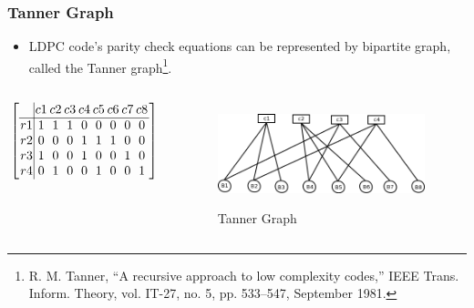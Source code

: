 \documentclass[xcolor=dvipsname]
{beamer}
\begin{document}
\begin{frame}[t]
	\frametitle{ Tanner Graph}
	\begin{itemize}
	\item LDPC code's parity check equations can be represented by bipartite graph, called the Tanner graph\footnote{R. M. Tanner, “A recursive approach to low complexity codes,” IEEE
Trans. Inform. Theory, vol. IT-27, no. 5, pp. 533–547, September 1981.}.
	\end{itemize}

	\begin{columns}[totalwidth=\textwidth]
		\begin{column}{0.5\textwidth}
		\centering
\[
\begingroup %
\setlength\arraycolsep{1pt}
\left[ \begin{array} {c|cccccccc} 
  &    c1 &   c2 &   c3 &  c4  &  c5  &  c6  &  c7  &  c8 \\ \hline
r1 &    1  &   1  &   1  &   0  &   0  &   0  &   0  &   0 \\
r2 &    0  &   0  &   0  &   1  &   1  &   1  &   0  &   0 \\ 
r3 &    1  &   0  &   0  &   1  &   0  &   0  &   1  &   0 \\
r4 &    0  &   1  &   0  &   0  &   1  &   0  &   0  &   1 \end{array} \right] 
\endgroup
\]			
	\end{column}%
	\begin{column}{0.5\textwidth}
		\centering
		\begin{figure}
		\includegraphics[height=3cm,width=6cm]{minSum1}
		\caption{ Tanner Graph }
	\end{figure}
	\end{column}%
\end{columns}
\end{frame}	
	
\end{document}
